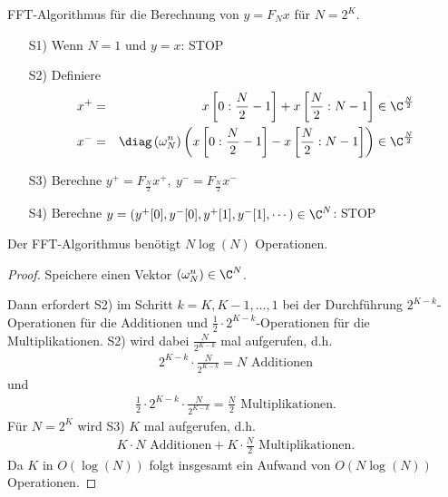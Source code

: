 \begin{Algorithmus}
    FFT-Algorithmus für die Berechnung von $y = F_N x$ für $N = 2^K$.
    \begin{itemize}
        \item[S1)]
	    Wenn $N = 1$ und $y = x$: STOP
	\item[S2)]
	    Definiere
	    \begin{eqnarray*}
                x^+
            &=& x\left[0 : \frac{N}{2} - 1\right]
                + x\left[\frac{N}{2} : N - 1\right]\in \C^\frac{N}{2} \\
                x^-
            &=& \diag\left(\omega_N^n\right)
                \left(x\left[0 : \frac{N}{2} - 1\right]
                - x\left[\frac{N}{2} : N - 1\right]\right)\in \C^\frac{N}{2}
	    \end{eqnarray*}
	\item[S3)]
	    Berechne $y^+ = F_\frac{N}{2} x^+, \ y^{-} = F_\frac{N}{2} x^-$
	\item[S4)]
	    Berechne $y = (y^+[0], y^-[0], y^+[1], y^-[1], \cdots) \in \C^N$: STOP
    \end{itemize}
\end{Algorithmus}


\begin{Satz}
    \label{satz:2.14}
    Der FFT-Algorithmus benötigt $N \log(N)$ Operationen.
\end{Satz}


\begin{proof} 
    Speichere einen Vektor $\left(\omega_N^n\right)\in \C^N$.

    Dann erfordert S2) im Schritt $k = K, K-1, \dots, 1$ bei der Durchführung
    $2^{K-k}$-Operationen für die Additionen und
    $\frac{1}{2} \cdot 2^{K-k}$-Operationen für die Multiplikationen.
    S2) wird dabei $\frac{N}{2^{K-k}}$ mal aufgerufen, d.h.
    \begin{eqnarray*}
        2^{K-k} \cdot \frac{N}{2^{K-k}} = N \text{ Additionen}
    \end{eqnarray*}
    und
    \begin{eqnarray*}
        \frac{1}{2} \cdot 2^{K-k} \cdot \frac{N}{2^{K-k}} = \frac{N}{2}
        \text{ Multiplikationen}.
    \end{eqnarray*}
    Für $N=2^K$ wird S3) $K$ mal aufgerufen, d.h.
    \begin{eqnarray*}
        K \cdot N \text{ Additionen} + K \cdot \frac{N}{2}
        \text{ Multiplikationen}.
    \end{eqnarray*}
    Da $K$ in $O(\log(N))$ folgt insgesamt ein Aufwand von $O(N \log(N))$
    Operationen.
\end{proof}


